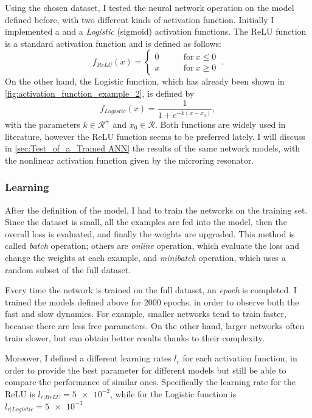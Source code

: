 Using the chosen dataset, I tested the neural network operation on the model defined before, with two different kinds of activation function.
Initially I implemented a  and a \textit{Logistic} (sigmoid) activation functions.
The \acs{ReLU} function is a standard activation function and is defined as follows:
\begin{equation}
f_{ReLU}(x) =
\begin{cases}
	0 & \qquad \mathrm{for}~ x\leq 0\\
	x & \qquad \mathrm{for}~ x\geq 0
\end{cases}~.
\label{eq:relu}
\end{equation}
On the other hand, the Logistic function, which has already been shown in \autoref{fig:activation_function_example_2}, is defined by
\begin{equation}
f_{Logistic}(x) = \frac{1}{1+e^{-k\left(x-x_0\right)}},
\end{equation}
with the parameters $k\in \mathcal{R}^+$ and $x_0\in \mathcal{R}$.
Both functions are widely used in literature, however the \acs{ReLU} function seems to be preferred lately.
I will discuss in \autoref{sec:Test_of_a_Trained ANN} the results of the same network models, with the nonlinear activation function given by the microring resonator.

\subsubsection{Learning}
After the definition of the model, I had to train the networks on the training set.
Since the dataset is small, all the examples are fed into the model, then the overall loss is evaluated, and finally the weights are upgraded.
This method is called \textit{batch} operation; others are \textit{online} operation, which evaluate the loss and change the weights at each example, and \textit{minibatch} operation, which uses a random subset of the full dataset.

Every time the network is trained on the full dataset, an \textit{epoch} is completed.
I trained the models defined above for \num{2000} epochs, in order to observe both the fast and slow dynamics.
For example, smaller networks tend to train faster, because there are less free parameters.
On the other hand, larger networks often train slower, but can obtain better results thanks to their complexity.

Moreover, I defined a different learning rates $l_r$ for each activation function, in order to provide the best parameter for different models but still be able to compare the performance of similar ones.
Specifically the learning rate for the \acs{ReLU} is $l_{r|ReLU} = \num{5e-2}$, while for the Logistic function is $l_{r|Logistic}= \num{5e-3}$

